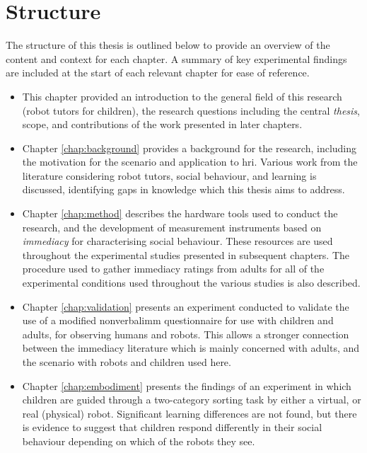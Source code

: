 \section{Structure}\label{sec:intro-struct}
The structure of this thesis is outlined below to provide an overview of the content and context for each chapter. A summary of key experimental findings are included at the start of each relevant chapter for ease of reference.

\begin{itemize}
\item This chapter provided an introduction to the general field of this research (robot tutors for children), the research questions including the central \textit{thesis}, scope, and contributions of the work presented in later chapters.

\item Chapter \ref{chap:background} provides a background for the research, including the motivation for the scenario and application to \acrshort{hri}. Various work from the literature considering robot tutors, social behaviour, and \gls{learning} is discussed, identifying gaps in knowledge which this thesis aims to address.

\item Chapter \ref{chap:method} describes the hardware tools used to conduct the research, and the development of measurement instruments based on \textit{\gls{immediacy}} for characterising social behaviour. These resources are used throughout the experimental studies presented in subsequent chapters. The procedure used to gather \gls{immediacy} ratings from adults for all of the experimental conditions used throughout the various studies is also described.

\item Chapter \ref{chap:validation} presents an experiment conducted to validate the use of a modified \gls{nonverbalimm} questionnaire for use with children and adults, for observing humans and robots. This allows a stronger connection between the \gls{immediacy} literature which is mainly concerned with adults, and the scenario with robots and children used here.

\item Chapter \ref{chap:embodiment} presents the findings of an experiment in which children are guided through a two-category sorting task by either a virtual, or real (physical) robot. Significant \gls{learning} differences are not found, but there is evidence to suggest that children respond differently in their social behaviour depending on which of the robots they see.


\end{itemize}
